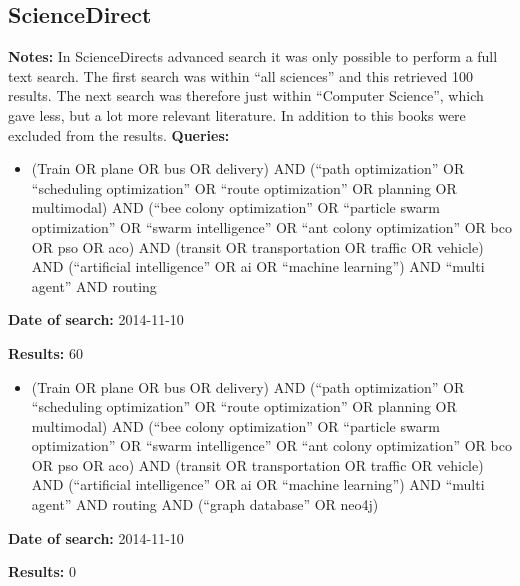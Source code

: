 \subsection{ScienceDirect}
\textbf{Notes:} In ScienceDirects advanced search it was only possible to perform a full text search. The first search was within ``all sciences'' and this retrieved 100 results. The next search was therefore just within ``Computer Science'', which gave less, but a lot more relevant literature. In addition to this books were excluded from the results.
\newline
\newline
\textbf{Queries:}
\begin{itemize}
\item (Train OR plane OR bus OR delivery) AND (``path optimization'' OR ``scheduling optimization'' OR ``route optimization'' OR planning OR multimodal) AND (``bee colony optimization'' OR ``particle swarm optimization'' OR ``swarm intelligence'' OR ``ant colony optimization'' OR bco OR pso OR aco) AND (transit OR transportation OR traffic OR vehicle) AND (``artificial intelligence'' OR ai OR ``machine learning'') AND ``multi agent'' AND routing
\end{itemize}
\par \textbf{Date of search:} 2014-11-10 
\par \textbf{Results:} 60
\begin{itemize}
\item (Train OR plane OR bus OR delivery) AND (``path optimization'' OR ``scheduling optimization'' OR ``route optimization'' OR planning OR multimodal) AND (``bee colony optimization'' OR ``particle swarm optimization'' OR ``swarm intelligence'' OR ``ant colony optimization'' OR bco OR pso OR aco) AND (transit OR transportation OR traffic OR vehicle) AND (``artificial intelligence'' OR ai OR ``machine learning'') AND ``multi agent'' AND routing AND (``graph database'' OR neo4j)
\end{itemize}
\par \textbf{Date of search:} 2014-11-10 
\par \textbf{Results:} 0


